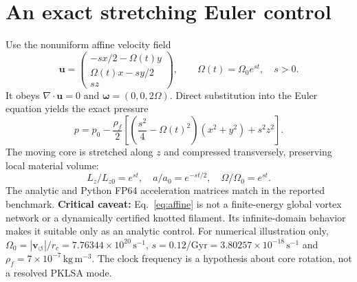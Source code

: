 \documentclass[10pt,a4paper]{article}
\newcommand{\vswirl}{\mathbf{v}_{\!\boldsymbol{\circlearrowleft}}}
\newcommand{\rhof}{\rho_{\!f}}
\newcommand{\rc}{r_c}
\begin{document}
\section{An exact stretching Euler control}
Use the nonuniform affine velocity field
\begin{equation}\label{eq:affine}
\mathbf u=\begin{pmatrix}-sx/2-\Omega(t)y\\\Omega(t)x-sy/2\\sz\end{pmatrix},\qquad
\Omega(t)=\Omega_0e^{st},\quad s>0.
\end{equation}
It obeys $\nabla\cdot\mathbf u=0$ and $\boldsymbol\omega=(0,0,2\Omega)$. Direct substitution into the Euler equation yields the exact pressure
\begin{equation}\label{eq:p}
p=p_0-\frac{\rhof}{2}\left[\left(\frac{s^2}{4}-\Omega(t)^2\right)(x^2+y^2)+s^2z^2\right].
\end{equation}
The moving core is stretched along $z$ and compressed transversely, preserving local material volume:
\begin{equation}\label{eq:stretch}L_z/L_{z0}=e^{st},\quad a/a_0=e^{-st/2},\quad\Omega/\Omega_0=e^{st}.
\end{equation}
The analytic and Python FP64 acceleration matrices match in the reported benchmark. \textbf{Critical caveat:} Eq.~\eqref{eq:affine} is not a finite-energy global vortex network or a dynamically certified knotted filament. Its infinite-domain behavior makes it suitable only as an analytic control. For numerical illustration only, $\Omega_0=|\vswirl|/\rc=7.76344\times10^{20}\,\mathrm{s}^{-1}$, $s=0.12/\mathrm{Gyr}=3.80257\times10^{-18}\,\mathrm{s}^{-1}$ and $\rhof=7\times10^{-7}\,\mathrm{kg\,m^{-3}}$. The clock frequency is a hypothesis about core rotation, not a resolved PKLSA mode.\par
\end{document}

